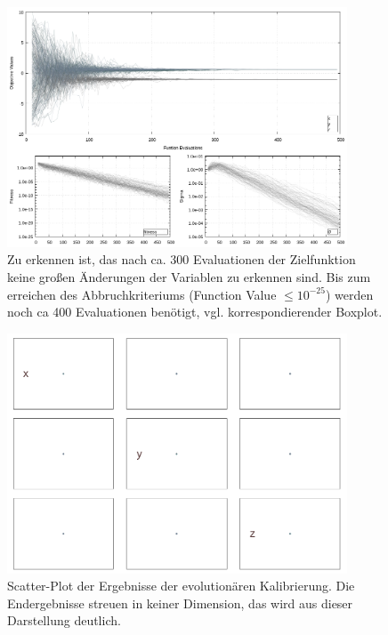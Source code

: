 %
%
\begin{figure}[!ht]
  \begin{center}
    \includegraphics[width=0.9\textwidth]{img/calibration/calibration_ant0-lines.png}
  \end{center}
  \caption[Linien-Plot der Endergebnisse der Kalibierung]{Zu erkennen ist, das nach ca. 300 Evaluationen der Zielfunktion keine großen Änderungen der Variablen zu erkennen sind. Bis zum erreichen des Abbruchkriteriums (Function Value $\leq10^{-25}$) werden noch ca 400 Evaluationen benötigt, vgl. korrespondierender Boxplot.}
  \label{fig:Final_Calibration_Ant0_ES-Lines}  
%  
\end{figure}
%
\begin{figure}[!ht]
  \begin{center}
    \includegraphics[width=0.9\textwidth]{img/calibration/calibration_ant0-scatter.png}
  \end{center}
  \caption[Kalibierung Scatter-Plot]{Scatter-Plot der Ergebnisse der evolutionären Kalibrierung. Die Endergebnisse streuen in keiner Dimension, das wird aus dieser Darstellung deutlich.}
  \label{fig:Final_Calibration_Ant0_ES-Scatter}  
%  
\end{figure}
